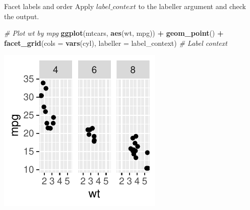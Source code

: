 \documentclass[
  ignorenonframetext,
]{beamer}
\newenvironment{Shaded}{\begin{snugshade}}{\end{snugshade}}
\newcommand{\AttributeTok}[1]{\textcolor[rgb]{0.13,0.29,0.53}{#1}}
\newcommand{\CommentTok}[1]{\textcolor[rgb]{0.56,0.35,0.01}{\textit{#1}}}
\newcommand{\FunctionTok}[1]{\textcolor[rgb]{0.13,0.29,0.53}{\textbf{#1}}}
\newcommand{\NormalTok}[1]{#1}
\newcommand{\SpecialCharTok}[1]{\textcolor[rgb]{0.81,0.36,0.00}{\textbf{#1}}}
\begin{document}
\begin{frame}[fragile]{Facet labels and order}
\label{facet-labels-and-order-5}
Apply \(label\_context\) to the labeller argument and check the output.


\begin{Shaded}
\begin{Highlighting}[]
\CommentTok{\# Plot wt by mpg}
\FunctionTok{ggplot}\NormalTok{(mtcars, }\FunctionTok{aes}\NormalTok{(wt, mpg)) }\SpecialCharTok{+} \FunctionTok{geom\_point}\NormalTok{() }\SpecialCharTok{+} \FunctionTok{facet\_grid}\NormalTok{(}\AttributeTok{cols =} \FunctionTok{vars}\NormalTok{(cyl),}
    \AttributeTok{labeller =}\NormalTok{ label\_context)  }\CommentTok{\# Label context}
\end{Highlighting}
\end{Shaded}

\begin{center}\includegraphics[width=0.5\linewidth]{Figs/unnamed-chunk-84-1} \end{center}
\end{frame}
\end{document}
